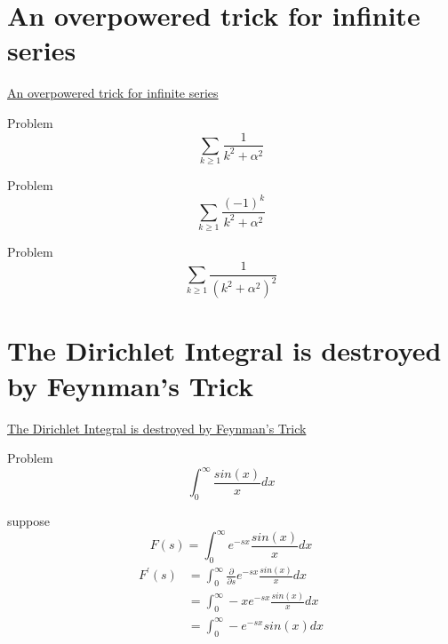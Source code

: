 \documentclass {article}
\begin{document}
\section{An overpowered trick for infinite series}
\href{https://www.youtube.com/watch?v=gd7FmQAVNmk}{An overpowered trick for infinite series}

Problem \[ \sum_{k \ge 1} \frac{1}{k^{2} + \alpha^{2}} \]

Problem \[ \sum_{k \ge 1} \frac{\left (-1\right)^k}{k^{2} + \alpha^{2}}\]

Problem \[ \sum_{k \ge 1} \frac{1}{\left(k^{2} + \alpha^{2}\right)^2}\]


\section{The Dirichlet Integral is destroyed by Feynman's Trick}
\href{https://www.youtube.com/watch?v=ZZccxuOpb4k}{The Dirichlet Integral is destroyed by Feynman's Trick}

Problem \[ \int_{0}^{\infty} \frac {sin\left(x\right)}{x} {d}x \]

suppose \[ F\left(s\right) = \int_{0}^{\infty} e^{-sx}\frac{sin(x)}{x} {d}x\]  
\[
\begin{matrix}
 F^{'}(s)  & = \int_{0}^{\infty} \frac{\partial}{\partial{s}} e^{-sx}\frac{sin(x)}{x} {d}x  \\
           & = \int_{0}^{\infty} -xe^{-sx} \frac{sin(x)}{x} {d}x  \\
           & = \int_{0}^{\infty} -e^{-sx} sin(x) {d}x 
\end{matrix}
\]
\end{document}
